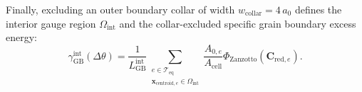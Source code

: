 \documentclass[11pt,a4paper]{article}
\begin{document}
Finally, excluding an outer boundary collar of width $w_{\text{collar}} = 4\,a_0$ defines the interior gauge region $\Omega_{\text{int}}$ and the collar-excluded specific grain boundary excess energy:
\begin{equation}
  \gamma_{\text{GB}}^{\text{int}}(\Delta\theta) = \frac{1}{L_{\text{GB}}^{\text{int}}} \sum_{\substack{e \in \mathcal{T}_{\text{eq}} \\ \mathbf{x}_{\text{centroid},e} \in \Omega_{\text{int}}}} \frac{A_{0,e}}{A_{\text{cell}}} \Phi_{\text{Zanzotto}}(\mathbf{C}_{\text{red},e}).
\end{equation}
\end{document}
